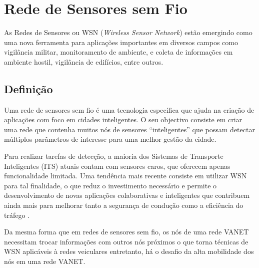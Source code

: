 \documentclass[
	12pt,				%
	oneside,			%
	a4paper,			%
	english,			%
	brazil				%
	]{abntex2ppgsi}
\begin{document}

\chapter{Rede de Sensores sem Fio}

As Redes de Sensores ou WSN (\textit{Wireless Sensor Network}) estão emergindo como uma nova ferramenta para aplicações importantes em diversos campos como vigilância militar, monitoramento de ambiente,  e coleta de informações em ambiente hostil, vigilância de edifícios, entre outros. 

\section{Definição}
Uma rede de sensores sem fio é uma tecnologia específica que ajuda na criação de aplicações com foco em cidades inteligentes. O seu objectivo consiste em criar uma rede que contenha muitos nós de sensores ``inteligentes'' que possam detectar múltiplos parâmetros de interesse para uma melhor gestão da cidade.

Para realizar tarefas de detecção, a maioria dos Sistemas de Transporte Inteligentes (ITS) atuais contam com sensores caros, que oferecem apenas funcionalidade limitada. Uma tendência mais recente consiste em utilizar WSN para tal finalidade, o que reduz o investimento necessário e permite o desenvolvimento de novas aplicações colaborativas e inteligentes que contribuem ainda mais para melhorar tanto a segurança de condução como a eficiência do tráfego \cite{losilla2011comprehensive}.

Da mesma forma que em redes de sensores sem fio, os nós de uma rede VANET necessitam trocar informações com outros nós próximos o que torna técnicas de WSN aplicáveis à redes veiculares entretanto, há o desafio da alta mobilidade dos nós em uma rede VANET.
\end{document}
